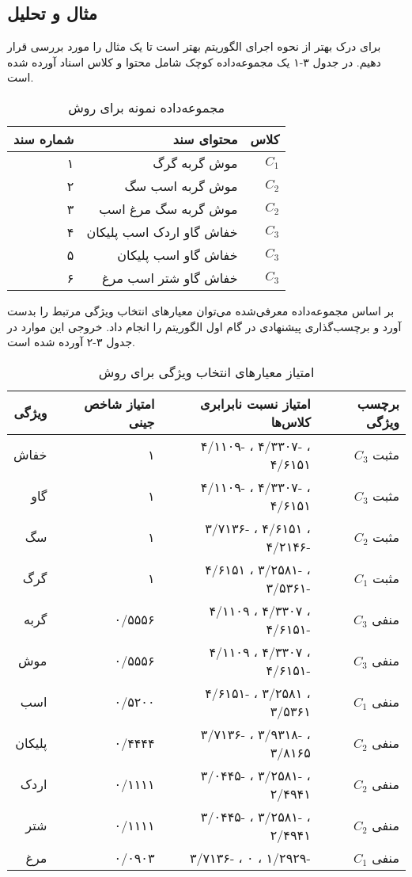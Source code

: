 \subsection{مثال و تحلیل}
برای درک بهتر از نحوه اجرای الگوریتم بهتر است تا یک مثال را مورد بررسی قرار دهیم.\cite{uysal2016improved}  در جدول ۳-۱ یک مجموعه‌داده کوچک شامل محتوا و کلاس اسناد آورده شده است. 

\begin{table}
\begin{center}
\caption{مجموعه‌داده نمونه برای روش }
\begin{tabular}{r|r|r}
\toprule
\textbf{شماره سند} & \textbf{محتوای سند} & \textbf{کلاس}
\\
\hline
\hline
۱ & موش گربه گرگ & $C_1$
\\
۲ & موش گربه اسب سگ & $C_2$
\\
۳ & موش گربه سگ مرغ اسب & $C_2$
\\
۴ & خفاش گاو اردک اسب پلیکان & $C_3$
\\
۵ & خفاش گاو اسب پلیکان & $C_3$
\\
۶ & خفاش گاو شتر اسب مرغ & $C_3$
\\
\bottomrule
\end{tabular}
\end{center}
\end{table}

بر اساس مجموعه‌داده معرفی‌شده می‌توان معیار‌های انتخاب ویژگی مرتبط را بدست آورد و برچسب‌گذاری پیشنهادی در گام اول الگوریتم را انجام داد. خروجی این موارد در جدول ۳-۲ آورده شده است. 

\begin{table}
\begin{center}
\caption{امتیاز معیار‌های انتخاب ویژگی برای روش }
\begin{tabular}{r|r|r|r}
\toprule
\textbf{ویژگی} & \textbf{امتیاز شاخص جینی} & \textbf{امتیاز نسبت نابرابری کلاس‌ها} & \textbf{برچسب ویژگی}
\\
\hline
\hline
خفاش & ۱ & ۴/۱۱۰۹- ، ۴/۳۳۰۷- ، ۴/۶۱۵۱ & $C_3$ مثبت
\\
گاو & ۱ & ۴/۱۱۰۹- ، ۴/۳۳۰۷- ، ۴/۶۱۵۱ & $C_3$ مثبت
\\
سگ & ۱ & ۳/۷۱۳۶- ، ۴/۶۱۵۱ ، ۴/۲۱۴۶- & $C_2$ مثبت
\\
گرگ & ۱ & ۴/۶۱۵۱ ، ۳/۲۵۸۱- ، ۳/۵۳۶۱- & $C_1$ مثبت
\\
گربه & ۰/۵۵۵۶ & ۴/۱۱۰۹ ، ۴/۳۳۰۷ ، ۴/۶۱۵۱- & $C_3$ منفی
\\
موش & ۰/۵۵۵۶ & ۴/۱۱۰۹ ، ۴/۳۳۰۷ ، ۴/۶۱۵۱- & $C_3$ منفی
\\
اسب & ۰/۵۲۰۰ & ۴/۶۱۵۱- ، ۳/۲۵۸۱ ، ۳/۵۳۶۱ & $C_1$ منفی
\\
پلیکان & ۰/۴۴۴۴ & ۳/۷۱۳۶- ، ۳/۹۳۱۸- ، ۳/۸۱۶۵ & $C_2$ منفی
\\
اردک & ۰/۱۱۱۱ & ۳/۰۴۴۵- ، ۳/۲۵۸۱- ، ۲/۴۹۴۱ & $C_2$ منفی
\\
شتر & ۰/۱۱۱۱ & ۳/۰۴۴۵- ، ۳/۲۵۸۱- ، ۲/۴۹۴۱ & $C_2$ منفی
\\
مرغ & ۰/۰۹۰۳ & ۳/۷۱۳۶- ، ۰ ، ۱/۲۹۲۹- & $C_1$ منفی
\\

\bottomrule 
\end{tabular}
\end{center}
\end{table}



